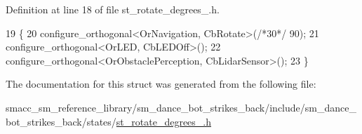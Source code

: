 Definition at line 18 of file st\+\_\+rotate\+\_\+degrees\+\_.\+h.


\begin{DoxyCode}
19   \{
20     configure\_orthogonal<OrNavigation, CbRotate>(\textcolor{comment}{/*30*/} 90);
21     configure\_orthogonal<OrLED, CbLEDOff>();
22     configure\_orthogonal<OrObstaclePerception, CbLidarSensor>();
23   \}
\end{DoxyCode}


The documentation for this struct was generated from the following file\+:\begin{DoxyCompactItemize}
\item 
smacc\+\_\+sm\+\_\+reference\+\_\+library/sm\+\_\+dance\+\_\+bot\+\_\+strikes\+\_\+back/include/sm\+\_\+dance\+\_\+bot\+\_\+strikes\+\_\+back/states/\hyperlink{strikes__back_2include_2sm__dance__bot__strikes__back_2states_2st__rotate__degrees__1_8h}{st\+\_\+rotate\+\_\+degrees\+\_.\+h}\end{DoxyCompactItemize}
